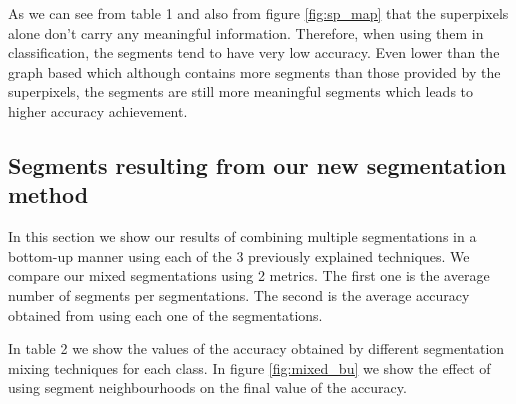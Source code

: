 \documentclass[twoside,11pt]{article}
\begin{document}
As we can see from table 1 and also from figure \ref{fig:sp_map}
that the superpixels alone don't carry any meaningful information. Therefore,
when using them in classification, the segments tend to have very low accuracy.
Even lower than the graph based which although contains more segments than those
provided by the superpixels, the segments are still more meaningful segments
which leads to higher accuracy achievement.

\subsection{Segments resulting from our new segmentation method}

In this section we show our results of combining multiple segmentations in a
bottom-up manner using each of the 3 previously explained techniques.
We compare our mixed segmentations using 2 metrics. The first one is the average
number of segments per segmentations. The second is the average accuracy
obtained from using each one of the segmentations.

In table 2 we show the values of the accuracy obtained by
different
segmentation mixing techniques for each class. In figure \ref{fig:mixed_bu} we
show the effect
of using segment neighbourhoods on the final value of the accuracy.
\end{document}
